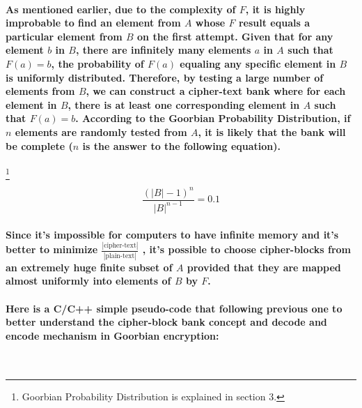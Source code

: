 \documentclass[oneside]{book}
\newcommand{\myparagraph}[1]{\paragraph{\textnormal{#1}}}
\begin{document}
\myparagraph{
As mentioned earlier, due to the complexity of $F$, it is highly improbable to find an element from $A$ whose $F$ result equals a particular element from $B$ on the first attempt. Given that for any element $b$ in $B$, there are infinitely many elements $a$ in $A$ such that $F(a) = b$, the probability of $F(a)$ equaling any specific element in $B$ is uniformly distributed. Therefore, by testing a large number of elements from $B$, we can construct a cipher-text bank where for each element in $B$, there is at least one corresponding element in $A$ such that $F(a) = b$. According to the \textbf{Goorbian Probability Distribution}, if $n$ elements are randomly tested from $A$, it is likely that the bank will be complete ($n$ is the answer to the following equation).
}
\footnote{Goorbian Probability Distribution is explained in section 3.}

$$\frac{(|B| - 1) ^ n}{|B| ^ {n - 1}} = 0.1$$

\myparagraph{
Since it's impossible for computers to have infinite memory and it's better to minimize $\frac{|\text{cipher-text}|}{|\text{plain-text}|}$ , it's possible to choose cipher-blocks from an extremely huge finite subset of $A$ provided that they are mapped almost uniformly into elements of $B$ by $F$.
}

\myparagraph{
Here is a C/C++ simple pseudo-code that following previous one to better understand the cipher-block bank concept and decode and encode mechanism in Goorbian encryption:
}

\,
\end{document}
